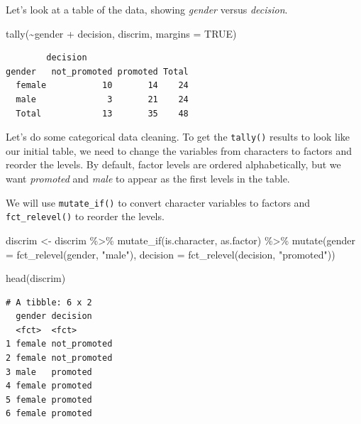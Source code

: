 \documentclass[
  letterpaper,
  DIV=11,
  numbers=noendperiod]{scrreprt}
\newenvironment{Shaded}{\begin{snugshade}}{\end{snugshade}}
\newcommand{\AttributeTok}[1]{\textcolor[rgb]{0.40,0.45,0.13}{#1}}
\newcommand{\ConstantTok}[1]{\textcolor[rgb]{0.56,0.35,0.01}{#1}}
\newcommand{\FunctionTok}[1]{\textcolor[rgb]{0.28,0.35,0.67}{#1}}
\newcommand{\NormalTok}[1]{\textcolor[rgb]{0.00,0.23,0.31}{#1}}
\newcommand{\OtherTok}[1]{\textcolor[rgb]{0.00,0.23,0.31}{#1}}
\newcommand{\SpecialCharTok}[1]{\textcolor[rgb]{0.37,0.37,0.37}{#1}}
\newcommand{\StringTok}[1]{\textcolor[rgb]{0.13,0.47,0.30}{#1}}
\begin{document}
Let's look at a table of the data, showing \emph{gender} versus
\emph{decision}.

\begin{Shaded}
\begin{Highlighting}[]
\FunctionTok{tally}\NormalTok{(}\SpecialCharTok{\textasciitilde{}}\NormalTok{gender }\SpecialCharTok{+}\NormalTok{ decision, discrim, }\AttributeTok{margins =} \ConstantTok{TRUE}\NormalTok{)}
\end{Highlighting}
\end{Shaded}

\begin{verbatim}
        decision
gender   not_promoted promoted Total
  female           10       14    24
  male              3       21    24
  Total            13       35    48
\end{verbatim}

Let's do some categorical data cleaning. To get the \texttt{tally()}
results to look like our initial table, we need to change the variables
from characters to factors and reorder the levels. By default, factor
levels are ordered alphabetically, but we want \emph{promoted} and
\emph{male} to appear as the first levels in the table.

We will use \texttt{mutate\_if()} to convert character variables to
factors and \texttt{fct\_relevel()} to reorder the levels.

\begin{Shaded}
\begin{Highlighting}[]
\NormalTok{discrim }\OtherTok{\textless{}{-}}\NormalTok{ discrim }\SpecialCharTok{\%\textgreater{}\%}
  \FunctionTok{mutate\_if}\NormalTok{(is.character, as.factor) }\SpecialCharTok{\%\textgreater{}\%}
  \FunctionTok{mutate}\NormalTok{(}\AttributeTok{gender =} \FunctionTok{fct\_relevel}\NormalTok{(gender, }\StringTok{"male"}\NormalTok{),}
         \AttributeTok{decision =} \FunctionTok{fct\_relevel}\NormalTok{(decision, }\StringTok{"promoted"}\NormalTok{))}
\end{Highlighting}
\end{Shaded}

\begin{Shaded}
\begin{Highlighting}[]
\FunctionTok{head}\NormalTok{(discrim)}
\end{Highlighting}
\end{Shaded}

\begin{verbatim}
# A tibble: 6 x 2
  gender decision    
  <fct>  <fct>       
1 female not_promoted
2 female not_promoted
3 male   promoted    
4 female promoted    
5 female promoted    
6 female promoted    
\end{verbatim}
\end{document}
